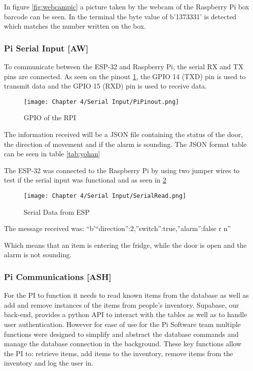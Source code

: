 In figure \ref{fig:webcampic} a picture taken by the webcam of the Raspberry Pi box barcode can be seen.
In the terminal the byte value of b'1373331' is detected which matches the number written on the box.

\subsubsection{Pi Serial Input [AW]}

To communicate between the ESP-32 and Raspberry Pi, the serial RX and TX pins are connected.
As seen on the pinout \ref{fig:rpigpio}, the GPIO 14 (TXD) pin is used to transmit data and the GPIO 15 (RXD) pin is used to receive data.

\begin{figure}[H]        
    \centering
    \texttt{[image: Chapter 4/Serial Input/PiPinout.png]}
    \caption{GPIO of the RPI}
    \label{fig:rpigpio} 
\end{figure} 

The information received will be a JSON file containing the status of the door, the direction of movement and if the alarm is sounding.
The JSON format table can be seen in table \ref{tab:yohan}

The ESP-32 was connected to the Raspberry Pi by using two jumper wires to test if the serial input was functional and as seen in \ref{fig:rpiserial}

\begin{figure}[H]        
    \centering
    \texttt{[image: Chapter 4/Serial Input/SerialRead.png]}
    \caption{Serial Data from ESP}
    \label{fig:rpiserial} 
\end{figure} 

The message received was: “b'{“direction”:2,”switch”:true,”alarm”:false} r n”

Which means that an item is entering the fridge, while the door is open and the alarm is not sounding.

\subsubsection{Pi Communications [ASH]}

For the PI to function it needs to read known items from the database as well as add and remove instances of the items from people's inventory.
Supabase, our back-end, provides a python API to interact with the tables as well as to handle user authentication.
However for ease of use for the Pi Software team multiple functions were designed to simplify and abstract the database commands and manage the database connection in the background.
These key functions allow the PI to: retrieve items, add items to the inventory, remove items from the inventory and log the user in.

